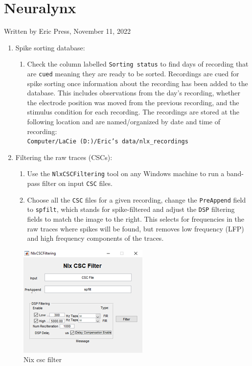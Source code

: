 \documentclass[
]{book}
\providecommand{\tightlist}{%
  \setlength{\itemsep}{0pt}\setlength{\parskip}{0pt}}
\begin{document}
\hypertarget{neuralynx}{%
\section{Neuralynx}\label{neuralynx}}

Written by Eric Press, November 11, 2022

\begin{enumerate}
\def\labelenumi{\arabic{enumi}.}
\item
  Spike sorting database:

  \begin{enumerate}
  \def\labelenumii{\arabic{enumii}.}
  \tightlist
  \item
    Check the column labelled \texttt{Sorting\ status} to find days of recording
    that are \texttt{cued} meaning they are ready to be sorted. Recordings are cued
    for spike sorting once information about the recording has been added to
    the database. This includes observations from the day's recording,
    whether the electrode position was moved from the previous recording,
    and the stimulus condition for each recording. The recordings are stored
    at the following location and are named/organized by date and time of
    recording:\\
    \texttt{Computer/LaCie\ (D:)/Eric’s\ data/nlx\_recordings}
  \end{enumerate}
\item
  Filtering the raw traces (CSCs):

  \begin{enumerate}
  \def\labelenumii{\arabic{enumii}.}
  \item
    Use the \texttt{NlxCSCFiltering} tool on any Windows machine to run a band-pass
    filter on input \texttt{CSC} files.
  \item
    Choose all the \texttt{CSC} files for a given recording, change the \texttt{PreAppend}
    field to \texttt{spfilt}, which stands for spike-filtered and adjust the \texttt{DSP}
    filtering fields to match the image to the right. This selects for
    frequencies in the raw traces where spikes will be found, but removes
    low frequency (LFP) and high frequency components of the traces.
  \end{enumerate}
\end{enumerate}

\begin{figure}
\centering
\includegraphics{source_images/sec3.2.1_nix_csc_filter.png}
\caption{Nix csc filter}
\end{figure}
\end{document}
